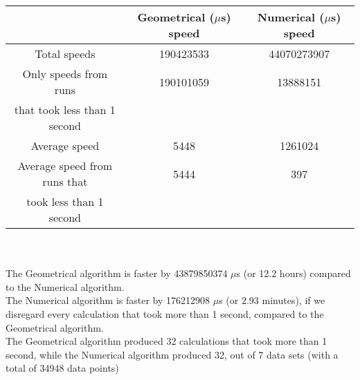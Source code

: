 \begin{tabular}[3]{c|c|c}
 & Geometrical ($\mu$s) speed & Numerical ($\mu$s) speed\\
\hline
Total speeds & 190423533 & 44070273907 \\ 
\hline 
Only speeds from runs & 190101059 & 13888151 \\ 
that took less than 1 second & & \\ 
\hline
Average speed & 5448 & 1261024 \\
\hline
Average speed from runs that & 5444 & 397 \\ 
took less than 1 second & & \\ 
\end{tabular}\\ \\
The Geometrical algorithm is faster by 43879850374 $\mu$s (or 12.2 hours) compared to the Numerical algorithm.\\
The Numerical algorithm is faster by 176212908 $\mu$s (or 2.93 minutes), if we disregard every calculation that took more than 1 second, compared to the Geometrical algorithm.\\
The Geometrical algorithm produced 32 calculations that took more than 1 second, while the Numerical algorithm produced 32, out of 7 data sets (with a total of 34948 data points)\\

